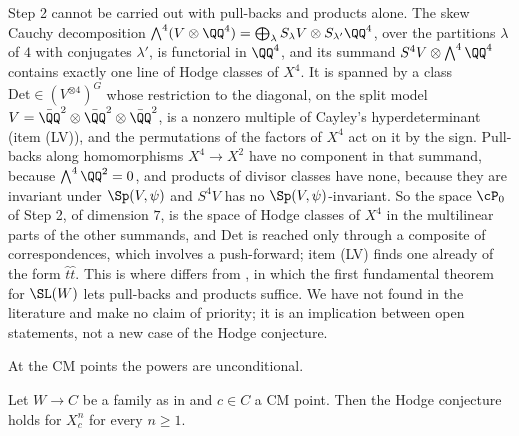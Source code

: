 \begin{remark}\label{rem:mumforddet}
Step 2 cannot be carried out with pull-backs and products alone. The skew
Cauchy decomposition $\bigwedge^{4}(V\otimes\QQ^{4})=\bigoplus_{\lambda}
S_{\lambda}V\otimes S_{\lambda'}\QQ^{4}$, over the partitions $\lambda$ of $4$
with conjugates $\lambda'$, is functorial in $\QQ^{4}$, and its summand
$S^{4}V\otimes\bigwedge^{4}\QQ^{4}$ contains exactly one line of Hodge classes
of $X^{4}$. It is spanned by a class $\mathrm{Det}\in(V^{\otimes4})^{G}$ whose
restriction to the diagonal, on the split model
$V=\bar{\QQ}^{2}\otimes\bar{\QQ}^{2}\otimes\bar{\QQ}^{2}$, is a nonzero
multiple of Cayley's hyperdeterminant (item (LV)), and the permutations of the
factors of $X^{4}$ act on it by the sign. Pull-backs along homomorphisms
$X^{4}\to X^{2}$ have no component in that summand, because
$\bigwedge^{4}\QQ^{2}=0$, and products of divisor classes have none, because
they are invariant under $\Sp(V,\psi)$ and $S^{4}V$ has no
$\Sp(V,\psi)$-invariant. So the space $\cP_{0}$ of Step 2, of dimension $7$,
is the space of Hodge classes of $X^{4}$ in the multilinear parts of the other
summands, and $\mathrm{Det}$ is reached only through a
composite of correspondences, which involves a push-forward; item (LV) finds
one already of the form $\hat{t}\hat{t}$. This is where
 differs from , in which the first
fundamental theorem for $\SL(W)$ lets pull-backs and products suffice. We have
not found  in the literature and make no claim of
priority; it is an implication between open statements, not a new case of the
Hodge conjecture.
\end{remark}

At the CM points the powers are unconditional.

\begin{proposition}\label{prop:mumfordcmpowers}
Let $W\to C$ be a family as in  and $c\in C$ a CM
point. Then the Hodge conjecture holds for $X_{c}^{n}$ for every $n\ge1$.
\end{proposition}

